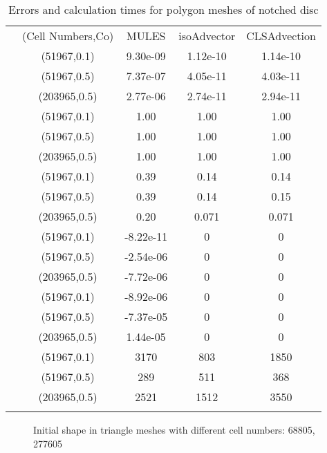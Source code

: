 \begin{table}
\centering
\caption{Errors and calculation times for polygon meshes of notched disc}
\label{Tab:02}
\begin{tabular}{ccccc}
\hline\noalign{\smallskip}
\quad &(Cell Numbers,Co) & MULES &isoAdvector &CLSAdvection  \\
\noalign{\smallskip}\hline\noalign{\smallskip}
\multirow{5}{*}{$\varepsilon_{V}$}
&(51967,0.1)& 9.30e-09 &1.12e-10 &1.14e-10  \\
&(51967,0.5) & 7.37e-07 &4.05e-11 &4.03e-11\\
&(203965,0.5)& 2.77e-06 &2.74e-11 &2.94e-11\\

\hline\noalign{\smallskip}
\multirow{5}{*}{$\varepsilon_{M}$}
&(51967,0.1)& 1.00 &1.00 &1.00  \\
&(51967,0.5) & 1.00 &1.00 &1.00\\
&(203965,0.5)& 1.00 &1.00 &1.00\\
\hline\noalign{\smallskip}
\multirow{5}{*}{$\varepsilon_{S}$}
&(51967,0.1)& 0.39 &0.14 &0.14  \\
&(51967,0.5) & 0.39 &0.14 &0.15\\
&(203965,0.5)& 0.20 &0.071 &0.071\\
\hline\noalign{\smallskip}
\multirow{5}{*}{$\min(\alpha)$}
&(51967,0.1)& -8.22e-11 &0 &0  \\
&(51967,0.5) & -2.54e-06 &0 &0\\
&(203965,0.5)& -7.72e-06 &0 &0\\
\hline\noalign{\smallskip}
\multirow{5}{*}{$\max(\alpha)-1$}
&(51967,0.1)& -8.92e-06 &0 &0  \\
&(51967,0.5) & -7.37e-05 &0 &0\\
&(203965,0.5)& 1.44e-05 &0 &0\\
\hline\noalign{\smallskip}
\multirow{5}{*}{$T_{calc}$}
&(51967,0.1)& 3170 &803 &1850  \\
&(51967,0.5) & 289 &511 &368\\
&(203965,0.5)& 2521 &1512 &3550\\
\noalign{\smallskip}\hline
\end{tabular}
\end{table}

\begin{figure}[htbp]
\centering
{}
\quad
{}
\caption{Initial shape in triangle meshes with different cell numbers: 68805,  277605}
\label{fig:trio0}
\end{figure}

